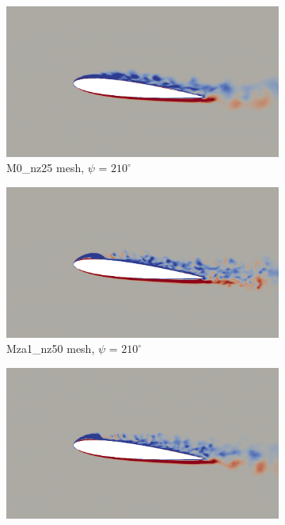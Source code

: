 \begin{figure}[H]
\centering
\begin{subfigure}[b]{0.475\textwidth}
\centering
\includegraphics[width=1\textwidth]{figures/adapt_strat/vorticity_plots/M0/phase_210.png}
\caption{M0\_nz25 mesh, $\psi$ = $210^\circ$}
\label{fig:M0_psi210}
\end{subfigure}
\begin{subfigure}[b]{0.475\textwidth}
\centering
\includegraphics[width=1\textwidth]{figures/adapt_strat/vorticity_plots/Mza1_50/phase_210.png}
\caption{Mza1\_nz50 mesh, $\psi$ = $210^\circ$}
\label{fig:Mza1_psi210}
\end{subfigure}
\begin{subfigure}[b]{0.475\textwidth}
\centering
\includegraphics[width=1\textwidth]{figures/adapt_strat/vorticity_plots/Msa1_50/phase_210.png}

\end{subfigure}
\end{figure}
